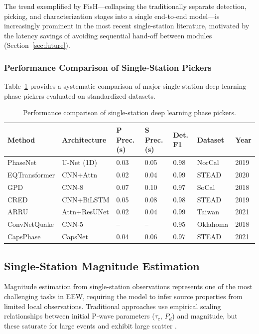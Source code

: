 \documentclass[review,authoryear]{elsarticle}
\begin{document}
The trend exemplified by FisH---collapsing the traditionally separate detection, picking, and characterization stages into a single end-to-end model---is increasingly prominent in the most recent single-station literature, motivated by the latency savings of avoiding sequential hand-off between modules (Section~\ref{sec:future}).

\subsubsection{Performance Comparison of Single-Station Pickers}

Table~\ref{tab:single_station_pickers} provides a systematic comparison of major single-station deep learning phase pickers evaluated on standardized datasets.

\begin{table}[H]
\centering
\caption{Performance comparison of single-station deep learning phase pickers.}
\label{tab:single_station_pickers}
\small
\begin{tabular}{p{2.5cm}p{2.0cm}p{1.5cm}p{1.5cm}p{1.5cm}p{1.5cm}p{1.2cm}}
\toprule
\textbf{Method} & \textbf{Architecture} & \textbf{P Prec. (s)} & \textbf{S Prec. (s)} & \textbf{Det. F1} & \textbf{Dataset} & \textbf{Year} \\
\midrule
PhaseNet & U-Net (1D) & 0.03 & 0.05 & 0.98 & NorCal & 2019 \\
EQTransformer & CNN+Attn & 0.02 & 0.04 & 0.99 & STEAD & 2020 \\
GPD & CNN-8 & 0.07 & 0.10 & 0.97 & SoCal & 2018 \\
CRED & CNN+BiLSTM & 0.05 & 0.08 & 0.98 & STEAD & 2019 \\
ARRU & Attn+ResUNet & 0.02 & 0.04 & 0.99 & Taiwan & 2021 \\
ConvNetQuake & CNN-5 & -- & -- & 0.95 & Oklahoma & 2018 \\
CapsPhase & CapsNet & 0.04 & 0.06 & 0.97 & STEAD & 2021 \\
\bottomrule
\end{tabular}
\end{table}

\subsection{Single-Station Magnitude Estimation}

Magnitude estimation from single-station observations represents one of the most challenging tasks in EEW, requiring the model to infer source properties from limited local observations. Traditional approaches use empirical scaling relationships between initial P-wave parameters ($\tau_c$, $P_d$) and magnitude, but these saturate for large events and exhibit large scatter \citep{wu2006magnitude, kuyuk2013global}.
\end{document}
